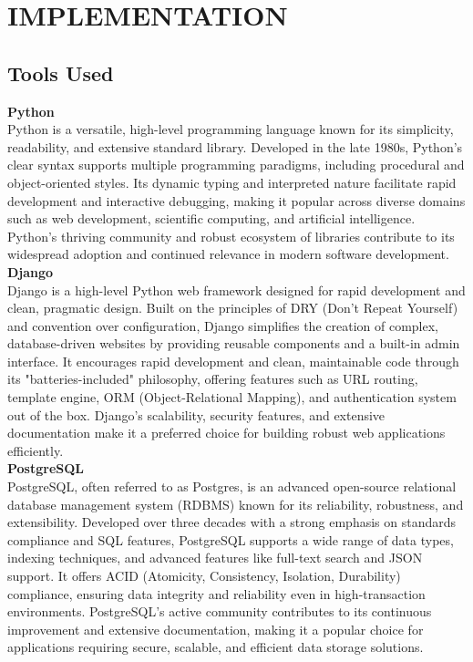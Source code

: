 \chapter{IMPLEMENTATION}





\section{Tools Used}
\textbf{Python}\\
Python is a versatile, high-level programming language known for its simplicity, readability, and extensive standard library. Developed in the late 1980s, Python's clear syntax supports multiple programming paradigms, including procedural and object-oriented styles. Its dynamic typing and interpreted nature facilitate rapid development and interactive debugging, making it popular across diverse domains such as web development, scientific computing, and artificial intelligence. Python's thriving community and robust ecosystem of libraries contribute to its widespread adoption and continued relevance in modern software development. \\
\textbf{Django}\\
Django is a high-level Python web framework designed for rapid development and clean, pragmatic design. Built on the principles of DRY (Don't Repeat Yourself) and convention over configuration, Django simplifies the creation of complex, database-driven websites by providing reusable components and a built-in admin interface. It encourages rapid development and clean, maintainable code through its "batteries-included" philosophy, offering features such as URL routing, template engine, ORM (Object-Relational Mapping), and authentication system out of the box. Django's scalability, security features, and extensive documentation make it a preferred choice for building robust web applications efficiently.
\\
\textbf{PostgreSQL}\\
PostgreSQL, often referred to as Postgres, is an advanced open-source relational database management system (RDBMS) known for its reliability, robustness, and extensibility. Developed over three decades with a strong emphasis on standards compliance and SQL features, PostgreSQL supports a wide range of data types, indexing techniques, and advanced features like full-text search and JSON support. It offers ACID (Atomicity, Consistency, Isolation, Durability) compliance, ensuring data integrity and reliability even in high-transaction environments. PostgreSQL's active community contributes to its continuous improvement and extensive documentation, making it a popular choice for applications requiring secure, scalable, and efficient data storage solutions.\\
